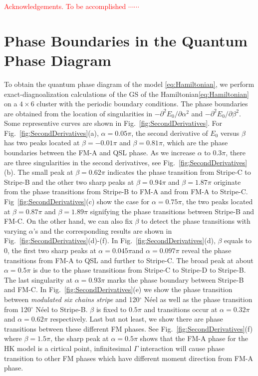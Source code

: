 \documentclass[aps,prb,reprint,amsfonts,amsmath,amssymb,showpacs,groupedaddress,superscriptaddress]{revtex4-1}
\begin{document}
\begin{acknowledgments}
    \textcolor{red}{Acknowledgements.  To be accomplished $\cdots \cdots$}
\end{acknowledgments}


\newpage
\appendix

\section{\label{apx:AppendixA}Phase Boundaries in the Quantum Phase Diagram}

To obtain the quantum phase diagram of the model \eqref{eq:Hamiltonian}, we perform exact-diagnoalization calculations of the GS of the Hamiltonian\eqref{eq:Hamiltonian} on a $4 \times 6$ cluster with the periodic boundary conditions. The phase boundaries are obtained from the location of singularities in $-\partial^2E_0/\partial\alpha^2$ and $-\partial^2E_0/\partial\beta^2$. Some representive curves are shown in Fig.~\ref{fig:SecondDerivatives}. For Fig.~\ref{fig:SecondDerivatives}(a), $\alpha=0.05\pi$, the second derivative of $E_0$ versus $\beta$ has two peaks located at $\beta=-0.01\pi$ and $\beta=0.81\pi$, which are the phase boundaries between the FM-A and QSL phase. As we increase $\alpha$ to $0.3\pi$, there are three singularities in the second derivatives, see Fig.~\ref{fig:SecondDerivatives}(b). The small peak at $\beta=0.62\pi$ indicates the phase transition from Stripe-C to Stripe-B and the other two sharp peaks at $\beta=0.94\pi$ and $\beta=1.87\pi$ originate from the phase transitions from Stripe-B to FM-A and from FM-A to Stripe-C. Fig~\ref{fig:SecondDerivatives}(c) show the case for $\alpha=0.75\pi$, the two peaks located at $\beta=0.87\pi$ and $\beta=1.89\pi$ signifying the phase transitions between Stripe-B and FM-C. On the other hand, we can also fix $\beta$ to detect the phase transitions with varying $\alpha$'s and the corresponding results are shown in Fig.~\ref{fig:SecondDerivatives}(d)-(f). In Fig.~\ref{fig:SecondDerivatives}(d), $\beta$ equals to $0$, the first two sharp peaks at $\alpha=0.045\pi$and $\alpha=0.097\pi$ reveal the phase transitions from FM-A to QSL and further to Stripe-C. The broad peak at about $\alpha=0.5\pi$ is due to the phase transitions from Stripe-C to Stripe-D to Stripe-B. The last singularity at $\alpha=0.93\pi$ marks the phase boundary between Stripe-B and FM-C. In Fig.~\ref{fig:SecondDerivatives}(e) we show the phase transition between \emph{modulated six chains stripe} and 120$^\circ$ N\'{e}el as well as the phase transition from 120$^\circ$ N\'{e}el to Stripe-B. $\beta$ is fixed to $0.5\pi$ and transitions occur at $\alpha=0.32\pi$ and $\alpha=0.62\pi$ respectively. Last but not least, we show there are phase transitions between these different FM phases. See Fig.~\ref{fig:SecondDerivatives}(f) where $\beta=1.5\pi$, the sharp peak at $\alpha=0.5\pi$ shows that the FM-A phase for the HK model is a cirtical point, infinitesimal $\Gamma$ interaction will cause phase transition to other FM phases which have different moment direction from FM-A phase.
\end{document}
